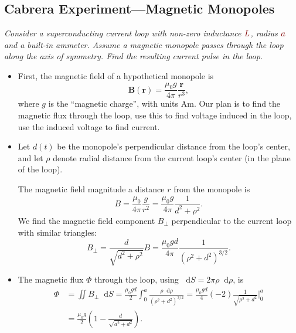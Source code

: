 \documentclass[11pt, a4paper]{article}
\newcommand{\diff}{\mathop{}\!\mathrm{d}} %
\newcommand{\dmath}[1]{\textcolor{Maroon}{#1}}  %
\renewcommand{\vec}[1]{\bm{#1}} %
\renewcommand{\r}{\vec{r}}
\newcommand{\B}{\vec{B}}  %
\newcommand{\mm}{\mu_{0}}  %
\newcommand{\m}{\vec{m}}  %
\begin{document}
\subsection{Cabrera Experiment---Magnetic Monopoles}
\textit{Consider a superconducting current loop with non-zero inductance $ \dmath{L} $, radius $ \dmath{a} $ and a built-in ammeter. Assume a magnetic monopole passes through the loop along the axis of symmetry. Find the resulting current pulse in the loop.}
\begin{itemize}
	\item First, the magnetic field of a hypothetical monopole is
	\begin{equation*}
		\B(\r) = \frac{\mm g}{4\pi} \frac{\r}{r^{3}},
	\end{equation*}
	where $ g $ is the ``magnetic charge'', with units $ \si{\ampere \meter} $. Our plan is to find the magnetic flux through the loop, use this to find voltage induced in the loop, use the induced voltage to find current.
	
	\item Let $ d(t) $ be the monopole's perpendicular distance from the loop's center, and let $ \rho $ denote radial distance from the current loop's center (in the plane of the loop).
	
	The magnetic field magnitude a distance $ r $ from the monopole is
	\begin{equation*}
		B = \frac{\mm}{4\pi} \frac{g}{r^{2}} = \frac{\mm g}{4\pi}\frac{1}{d^{2} + \rho^{2}}.
	\end{equation*}
	We find the magnetic field component $ B_{\perp} $ perpendicular to the current loop with similar triangles:
	\begin{equation*}
		B_{\perp} = \frac{d}{\sqrt{d^{2} + \rho^{2}}} B = \frac{\mm g d}{4\pi}\frac{1}{(\rho^{2} + d^{2})^{3/2}}.
	\end{equation*}
	
	\item The magnetic flux $ \Phi $ through the loop, using $  \diff S = 2\pi \rho \diff \rho $, is
	\begin{align*}
		\Phi &= \iint B_{\perp} \diff S = \frac{\mm g d}{2} \int_{0}^{a} \frac{\rho \diff \rho}{(\rho^{2} + d^{2})^{3/2}} = \frac{\mm g d}{4}(-2)\frac{1}{\sqrt{\rho^{2} + d^{2}}}\bigg |_{0}^{a}\\
		& = \frac{\mm g}{2}\left(1 - \frac{d}{\sqrt{a^{2} + d^{2}}}\right).
	\end{align*}
	

\end{itemize}
\end{document}
